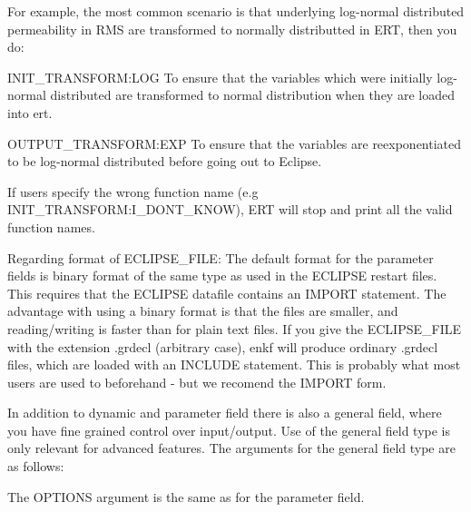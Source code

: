 \documentclass[a4paper,10pt,english]{sphinxmanual}
\begin{document}
\begin{sphinxShadowBox}
For example, the most common scenario is that underlying log-normal
distributed permeability in RMS are transformed to normally distributted in
ERT, then you do:

INIT\_TRANSFORM:LOG To ensure that the variables which were initially
log-normal distributed are transformed to normal distribution when they are
loaded into ert.

OUTPUT\_TRANSFORM:EXP To ensure that the variables are reexponentiated to be
log-normal distributed before going out to Eclipse.

If users specify the wrong function name (e.g INIT\_TRANSFORM:I\_DONT\_KNOW), ERT
will stop and print all the valid function names.

Regarding format of ECLIPSE\_FILE: The default format for the parameter fields
is binary format of the same type as used in the ECLIPSE restart files. This
requires that the ECLIPSE datafile contains an IMPORT statement. The advantage
with using a binary format is that the files are smaller, and reading/writing
is faster than for plain text files. If you give the ECLIPSE\_FILE with the
extension .grdecl (arbitrary case), enkf will produce ordinary .grdecl files,
which are loaded with an INCLUDE statement. This is probably what most users
are used to beforehand - but we recomend the IMPORT form.


In addition to dynamic and parameter field there is also a general field,
where you have fine grained control over input/output. Use of the general
field type is only relevant for advanced features. The arguments for the
general field type are as follows:

%
\begin{sphinxVerbatim}[commandchars=\\\{\}]
               
\end{sphinxVerbatim}

The OPTIONS argument is the same as for the parameter field.
\end{sphinxShadowBox}
\label{\detokenize{keywords/index:gen-data}}
\end{document}

